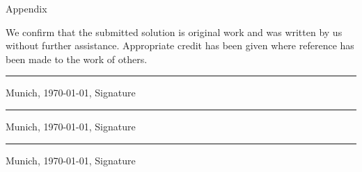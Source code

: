 \newpage

\vspace*{-15.8mm}
\fontsize{19pt}{21pt}\selectfont

\vspace{25.3mm}
Appendix

\normalsize\selectfont
\vspace{13.2mm}
We confirm that the submitted solution is original work and was written by us without further assistance. Appropriate credit has been given where reference has been made to the work of others.

\vspace{18.1mm}
\rule[-3.7mm]{\linewidth}{0.5pt}
Munich, \today, Signature \PersonOne

\vspace{18.1mm}
\rule[-3.7mm]{\linewidth}{0.5pt}
Munich, \today, Signature \PersonTwo

\vspace{18.1mm}
\rule[-3.7mm]{\linewidth}{0.5pt}
Munich, \today, Signature \PersonThree
